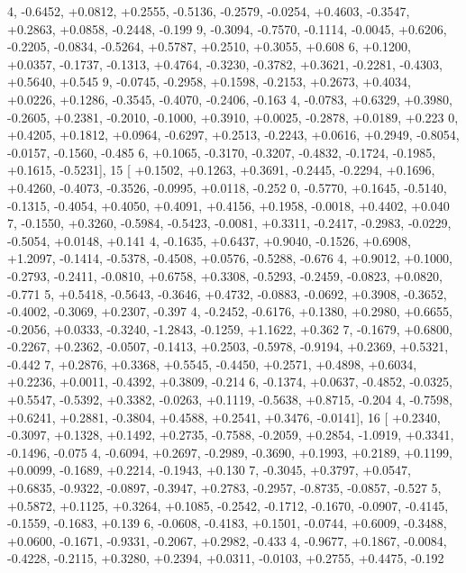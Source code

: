\begin{DoxyCode}
      4, -0.6452, +0.0812, +0.2555, -0.5136, -0.2579, -0.0254, +0.4603, -0.3547, +0.2863, +0.0858, -0.2448, -0.199
      9, -0.3094, -0.7570, -0.1114, -0.0045, +0.6206, -0.2205, -0.0834, -0.5264, +0.5787, +0.2510, +0.3055, +0.608
      6, +0.1200, +0.0357, -0.1737, -0.1313, +0.4764, -0.3230, -0.3782, +0.3621, -0.2281, -0.4303, +0.5640, +0.545
      9, -0.0745, -0.2958, +0.1598, -0.2153, +0.2673, +0.4034, +0.0226, +0.1286, -0.3545, -0.4070, -0.2406, -0.163
      4, -0.0783, +0.6329, +0.3980, -0.2605, +0.2381, -0.2010, -0.1000, +0.3910, +0.0025, -0.2878, +0.0189, +0.223
      0, +0.4205, +0.1812, +0.0964, -0.6297, +0.2513, -0.2243, +0.0616, +0.2949, -0.8054, -0.0157, -0.1560, -0.485
      6, +0.1065, -0.3170, -0.3207, -0.4832, -0.1724, -0.1985, +0.1615, -0.5231],
15 [ +0.1502, +0.1263, +0.3691, -0.2445, -0.2294, +0.1696, +0.4260, -0.4073, -0.3526, -0.0995, +0.0118, -0.252
      0, -0.5770, +0.1645, -0.5140, -0.1315, -0.4054, +0.4050, +0.4091, +0.4156, +0.1958, -0.0018, +0.4402, +0.040
      7, -0.1550, +0.3260, -0.5984, -0.5423, -0.0081, +0.3311, -0.2417, -0.2983, -0.0229, -0.5054, +0.0148, +0.141
      4, -0.1635, +0.6437, +0.9040, -0.1526, +0.6908, +1.2097, -0.1414, -0.5378, -0.4508, +0.0576, -0.5288, -0.676
      4, +0.9012, +0.1000, -0.2793, -0.2411, -0.0810, +0.6758, +0.3308, -0.5293, -0.2459, -0.0823, +0.0820, -0.771
      5, +0.5418, -0.5643, -0.3646, +0.4732, -0.0883, -0.0692, +0.3908, -0.3652, -0.4002, -0.3069, +0.2307, -0.397
      4, -0.2452, -0.6176, +0.1380, +0.2980, +0.6655, -0.2056, +0.0333, -0.3240, -1.2843, -0.1259, +1.1622, +0.362
      7, -0.1679, +0.6800, -0.2267, +0.2362, -0.0507, -0.1413, +0.2503, -0.5978, -0.9194, +0.2369, +0.5321, -0.442
      7, +0.2876, +0.3368, +0.5545, -0.4450, +0.2571, +0.4898, +0.6034, +0.2236, +0.0011, -0.4392, +0.3809, -0.214
      6, -0.1374, +0.0637, -0.4852, -0.0325, +0.5547, -0.5392, +0.3382, -0.0263, +0.1119, -0.5638, +0.8715, -0.204
      4, -0.7598, +0.6241, +0.2881, -0.3804, +0.4588, +0.2541, +0.3476, -0.0141],
16 [ +0.2340, -0.3097, +0.1328, +0.1492, +0.2735, -0.7588, -0.2059, +0.2854, -1.0919, +0.3341, -0.1496, -0.075
      4, -0.6094, +0.2697, -0.2989, -0.3690, +0.1993, +0.2189, +0.1199, +0.0099, -0.1689, +0.2214, -0.1943, +0.130
      7, -0.3045, +0.3797, +0.0547, +0.6835, -0.9322, -0.0897, -0.3947, +0.2783, -0.2957, -0.8735, -0.0857, -0.527
      5, +0.5872, +0.1125, +0.3264, +0.1085, -0.2542, -0.1712, -0.1670, -0.0907, -0.4145, -0.1559, -0.1683, +0.139
      6, -0.0608, -0.4183, +0.1501, -0.0744, +0.6009, -0.3488, +0.0600, -0.1671, -0.9331, -0.2067, +0.2982, -0.433
      4, -0.9677, +0.1867, -0.0084, -0.4228, -0.2115, +0.3280, +0.2394, +0.0311, -0.0103, +0.2755, +0.4475, -0.192

\end{DoxyCode}
